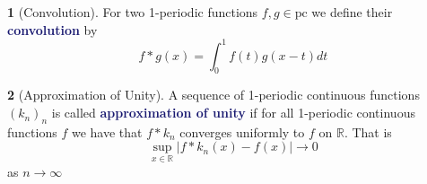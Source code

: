 \documentclass[11pt]{article}
\numberwithin{equation}{section}
\newcommand{\navy}[1]{\textcolor{MidnightBlue}{\bf #1}}
\theoremstyle{plain}
\theoremstyle{definition}
\newtheorem{definition}{\color{MidnightBlue}{\textbf{Definition}}}[section]
\newcommand\abs[1]{\left| #1 \right|}
\newcommand{\1}{\mathbbm 1}
\newcommand{\RR}{\mathbb R}
\begin{document}
\begin{definition}[Convolution]
	For two 1-periodic functions $f,g \in \text{pc}$ we define their \navy{convolution} by
	\begin{equation}
		f * g(x) = \int_0^1 f(t)g(x-t)dt
	\end{equation}
\end{definition}


\begin{definition}[Approximation of Unity]
	A sequence of 1-periodic continuous functions $(k_n)_n$ is called \navy{approximation of unity} if for all 1-periodic continuous functions $f$ we have that $f * k_n$ converges uniformly to $f$ on $\RR$. That is
	\begin{equation}
		\sup_{x \in \RR} \abs{f * k_n(x) - f(x)} \to 0
	\end{equation}
	as $n \to \infty$
\end{definition}
\end{document}
